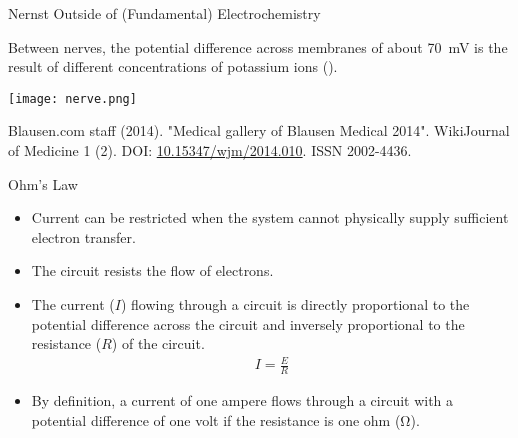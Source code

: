 \documentclass[notes=only]{beamer}
\begin{document}
\begin{frame}{Nernst Outside of (Fundamental) Electrochemistry}
	\begin{minipage}{0.6\textwidth}
		\raggedright{}
		Between nerves, the potential difference across membranes of about
		\SI{70}{\milli\volt} is the result of different concentrations of
		potassium ions ().
	\end{minipage}
	\hfill
	\begin{minipage}{0.3\textwidth}
		\texttt{[image: nerve.png]}
	\end{minipage}

	\bigskip
	
	\begin{footnotesize}
		Blausen.com staff (2014). "Medical gallery of Blausen
		Medical 2014". WikiJournal of Medicine 1 (2).
		DOI: \href{dx.doi.org/10.15347/wjm/2014.010}{10.15347/wjm/2014.010}. ISSN 2002-4436.
	\end{footnotesize}
\end{frame}




\clearpage
			
\begin{frame}{Ohm's Law}
	\begin{itemize}
		\item Current can be restricted when the system cannot
			physically supply sufficient electron transfer.
		\item The circuit \alert{resists} the flow of electrons.
		\item The current ($I$) flowing through a circuit is directly
			proportional to the \alert{potential difference} across
			the circuit and inversely proportional to the resistance
			($R$) of the circuit.
			\begin{align*}
				I = \frac{E}{R}
			\end{align*}
		\item By definition, a current of one ampere flows through a
			circuit with a potential difference of one volt if the
			resistance is one ohm (\si{\ohm}).
	\end{itemize}
\end{frame}
\end{document}
